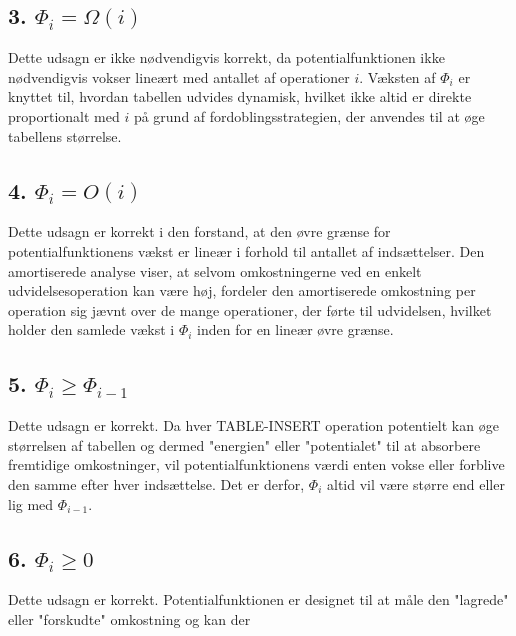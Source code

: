 \documentclass{article}
\begin{document}
\subsection*{3. $\Phi_i = \Omega(i)$}
Dette udsagn er ikke nødvendigvis korrekt, da potentialfunktionen ikke nødvendigvis vokser lineært med antallet af operationer $i$. Væksten af $\Phi_i$ er knyttet til, hvordan tabellen udvides dynamisk, hvilket ikke altid er direkte proportionalt med $i$ på grund af fordoblingsstrategien, der anvendes til at øge tabellens størrelse.

\subsection*{4. $\Phi_i = O(i)$}
Dette udsagn er korrekt i den forstand, at den øvre grænse for potentialfunktionens vækst er lineær i forhold til antallet af indsættelser. Den amortiserede analyse viser, at selvom omkostningerne ved en enkelt udvidelsesoperation kan være høj, fordeler den amortiserede omkostning per operation sig jævnt over de mange operationer, der førte til udvidelsen, hvilket holder den samlede vækst i $\Phi_i$ inden for en lineær øvre grænse.

\subsection*{5. $\Phi_i \geq \Phi_{i-1}$}
Dette udsagn er korrekt. Da hver TABLE-INSERT operation potentielt kan øge størrelsen af tabellen og dermed "energien" eller "potentialet" til at absorbere fremtidige omkostninger, vil potentialfunktionens værdi enten vokse eller forblive den samme efter hver indsættelse. Det er derfor, $\Phi_i$ altid vil være større end eller lig med $\Phi_{i-1}$.

\subsection*{6. $\Phi_i \geq 0$}
Dette udsagn er korrekt. Potentialfunktionen er designet til at måle den "lagrede" eller "forskudte" omkostning og kan der

\\
\end{document}
